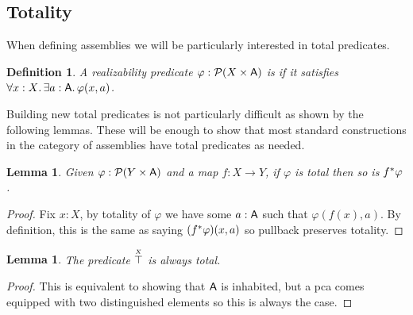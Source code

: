 \documentclass[11pt]{article}
\newtheorem{lemm}[thrm]{Lemma}
\newtheorem{defn}[thrm]{Definition}
\begin{document}

\subsection{Totality}

When defining assemblies we will be particularly interested in total
predicates.

\begin{defn}\label{defn:tripos-total-predicates}
  A realizability predicate \(\varphi : \mathcal{P}{({X}\times{\ensuremath{\mathsf{A}}})}\) is 
  if it satisfies \(\forall{x:X}.\,{\exists{a:\ensuremath{\mathsf{A}}}.\,{\varphi(x,a)}}\).
\end{defn}

Building new total predicates is not particularly difficult as shown by
the following lemmas.
%
These will be enough to show that most standard constructions in the
category of assemblies have total predicates as needed.

\begin{lemm}\label{lemm:pullback-preserves-total}
  Given \(\varphi : \mathcal{P}{({Y}\times{\ensuremath{\mathsf{A}}})}\) and a map \(f : X \to Y\), if
  \(\varphi\) is total then so is \({f}^\ast\varphi\).
\end{lemm}
\begin{proof}
  Fix \(x:X\), by totality of \(\varphi\) we have some \(a:\mathsf{A}\) such that
  \(\varphi(f(x),a)\).
  By definition, this is the same as saying \(({f}^\ast\varphi)(x,a)\) so
  pullback preserves totality.
\end{proof}

\begin{lemm}\label{lemm:top-total}
  The predicate \(\overset{\scriptscriptstyle X}{\top}\) is always total.
\end{lemm}
\begin{proof}
  This is equivalent to showing that \(\mathsf{A}\) is inhabited, but a pca
  comes equipped with two distinguished elements so this is always the case.
\end{proof}
\end{document}
